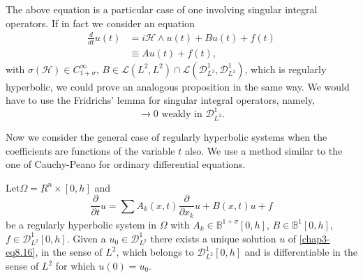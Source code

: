 \begin{remark*}%
The above equation is a particular case of one involving singular
integral operators. If in fact we consider an equation  
\begin{align*}
\frac{d}{dt} u(t) & = i \mathscr{H} \wedge u(t) + Bu(t) + f(t)\\
& \equiv A u(t) + f(t), \tag{8.14}\label{chap3-eq8.14}
\end{align*}
with $\sigma (\mathscr{H}) \in C^{\infty}_{1 + \sigma}$, $B
\in \mathscr{L} (L^2, L^2) \cap \mathscr{L}(\mathscr{D}^1_{L^2},
\mathscr{D}^1_{L^2})$, which is regularly hyperbolic, we could prove
an analogous proposition in the same way. We would have to use the
Fridrichs' lemma for singular integral operators, namely, 
\begin{equation*}
[\mathscr{H} \wedge, \varphi_{\delta} *] \to 0 \text{ weakly in }
\mathscr{D}^1_{L^2}. \tag{8.15}\label{chap3-eq8.15} 
\end{equation*}
\end{remark*}

Now we consider the general case of regularly hyperbolic systems when
the coefficients are functions of the variable $t$ also. We use a
method similar to the one of Cauchy-Peano for ordinary differential
equations. 

\begin{theorem}\label{chap3-sec8-thm2}%
Let\pageoriginale $\Omega = \underbar{R}^n \times [0, h]$ and  
\begin{equation*}
\frac{\partial}{\partial t} u = \sum A_k (x, t)
\frac{\partial}{\partial x_k} u + B(x ,t) u + f
\tag{8.16} \label{chap3-eq8.16}
\end{equation*}
be a regularly hyperbolic system in $\Omega$ with $A_k \in
\mathbb{B}^{1+ \sigma} [0, h]$, $B \in \mathbb{B}^1 [0, h]$,
$f \in \mathscr{D}^1_{L^2} [0, h]$. Given a $u_0 \in
\mathscr{D}^1_{L^2}$ there exists a unique solution $u$ of
\eqref{chap3-eq8.16}, in 
the sense of $L^2$, which belongs to $\mathscr{D}^1_{L^2} [0, h]$ and
is differentiable in the sense of $L^2$ for which $u(0) = u_0$. 
\end{theorem}

